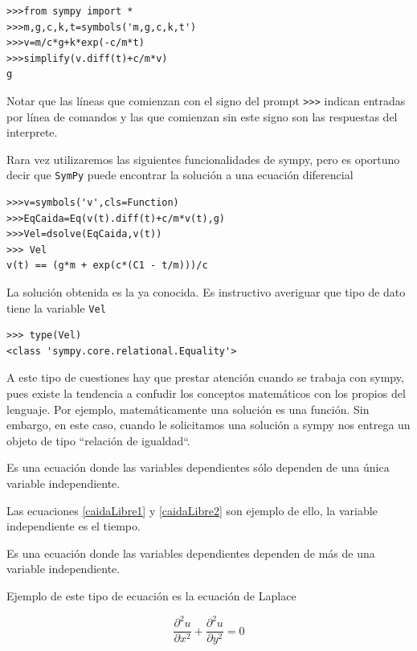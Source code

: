 \documentclass{article}
\newcounter{ejemplo_cont}
\begin{document}
\begin{lstlisting}
>>>from sympy import *
>>>m,g,c,k,t=symbols('m,g,c,k,t')
>>>v=m/c*g+k*exp(-c/m*t)
>>>simplify(v.diff(t)+c/m*v)
g
\end{lstlisting}
Notar que las líneas que comienzan con el signo del prompt \verb~>>>~ indican entradas por línea de comandos y las que comienzan sin este signo son las respuestas del interprete.

Rara vez utilizaremos las siguientes funcionalidades de sympy, pero es oportuno decir que
 \texttt{SymPy} puede encontrar la solución a una ecuación diferencial

\begin{lstlisting}
>>>v=symbols('v',cls=Function)
>>>EqCaida=Eq(v(t).diff(t)+c/m*v(t),g)
>>>Vel=dsolve(EqCaida,v(t))
>>> Vel
v(t) == (g*m + exp(c*(C1 - t/m)))/c
\end{lstlisting}

La solución obtenida es la ya conocida. Es instructivo averiguar que tipo de dato tiene la variable \verb~Vel~

\begin{lstlisting}
>>> type(Vel)
<class 'sympy.core.relational.Equality'>
\end{lstlisting}
A este tipo de cuestiones hay que prestar atención cuando se trabaja con sympy, pues existe la tendencia a confudir los conceptos matemáticos con los propios del lenguaje. Por ejemplo, matemáticamente una solución es una función. Sin embargo, en este caso, cuando le solicitamos una solución a sympy nos entrega un objeto de tipo  ``relación de igualdad``.





\begin{definicion} Es una ecuación donde las variables dependientes sólo dependen de una única variable independiente.
\end{definicion}

Las
ecuaciones \eqref{caidaLibre1} y \eqref{caidaLibre2} son ejemplo de ello, la variable independiente es el tiempo.
  \begin{definicion} Es una ecuación donde las variables dependientes dependen de más de una variable independiente.
   \end{definicion}

Ejemplo de este tipo de ecuación es la ecuación de Laplace

\[\frac{\partial^2 u}{\partial x^2}+\frac{\partial^2 u}{\partial y^2}=0\]
\end{document}
